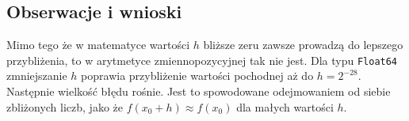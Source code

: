 \documentclass{article}
\begin{document}
\subsection{Obserwacje i wnioski}
Mimo tego że w matematyce wartości $h$ bliższe zeru zawsze prowadzą do lepszego przybliżenia, to w arytmetyce
zmiennopozycyjnej tak nie jest. Dla typu \texttt{Float64} zmniejszanie $h$ poprawia przybliżenie wartości pochodnej aż
do $h = 2^{-28}$. Następnie wielkość błędu rośnie. Jest to spowodowane odejmowaniem od siebie zbliżonych liczb, jako że
$f(x_0 + h) \approx f(x_0)$ dla małych wartości $h$.
\end{document}

